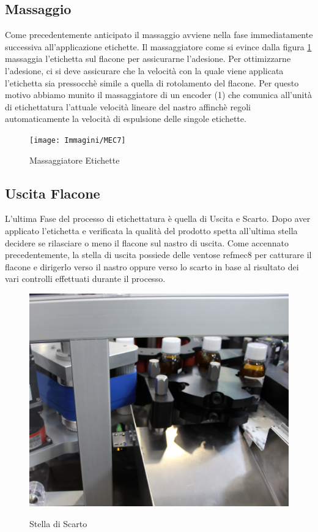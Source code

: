 \documentclass[12pt, a4paper, oneside]{book}
\begin{document}
\subsection{Massaggio}
Come precedentemente anticipato il massaggio avviene nella fase immediatamente successiva all'applicazione etichette. Il massaggiatore come si evince dalla figura \ref{MEC7} massaggia l'etichetta sul flacone per assicurarne l'adesione. Per ottimizzarne l'adesione, ci si deve assicurare che la velocità con la quale viene applicata l'etichetta sia pressocchè simile a quella di rotolamento del flacone. Per questo motivo abbiamo munito il massaggiatore di un encoder (1) che comunica all'unità di etichettatura l'attuale velocità lineare del nastro affinchè regoli automaticamente la velocità di espulsione delle singole etichette.

\begin{figure}[H]
	\centering
	\texttt{[image: Immagini/MEC7]}
	\label{MEC7}
	\caption{ Massaggiatore Etichette }
\end{figure}

\subsection{Uscita Flacone}
L'ultima Fase del processo di etichettatura è quella di Uscita e Scarto. Dopo aver applicato l'etichetta e verificata la qualità del prodotto spetta all'ultima stella decidere se rilasciare o meno il flacone sul nastro di uscita. Come accennato precedentemente, la stella di uscita possiede delle ventose ref{mec8} per catturare il flacone e dirigerlo verso il nastro oppure verso lo scarto in base al risultato dei vari controlli effettuati durante il processo.

\begin{figure}[H]
	\centering
	\includegraphics[width=12cm]{Immagini/MEC8}
	\label{mec8}
	\caption{ Stella di Scarto }
\end{figure}
\end{document}

